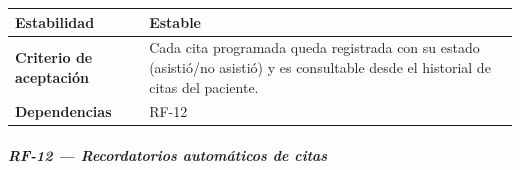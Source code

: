 \documentclass[
]{article}
\newcounter{none} %
\begin{document}
{\def\LTcaptype{none} %
\begin{longtable}[]{@{}
  >{\raggedright\arraybackslash}p{}
  >{\raggedright\arraybackslash}p{}@{}}
\toprule\noalign{}
\begin{minipage}[b]{\linewidth}\raggedright
\textbf{Estabilidad}
\end{minipage} & \begin{minipage}[b]{\linewidth}\raggedright
Estable
\end{minipage} \\
\midrule\noalign{}
\endhead
\bottomrule\noalign{}
\endlastfoot
\textbf{Criterio de aceptación} &
\begin{minipage}[t]{\linewidth}\raggedright
Cada cita programada queda registrada con su estado (asistió/no asistió)
y es consultable desde el historial de citas del paciente.
\end{minipage} \\
\textbf{Dependencias} & \begin{minipage}[t]{\linewidth}\raggedright
RF-12
\end{minipage} \\
\end{longtable}
}

\subparagraph{RF-12 --- Recordatorios automáticos de
citas}\label{rf-12-recordatorios-automuxe1ticos-de-citas}
\end{document}
